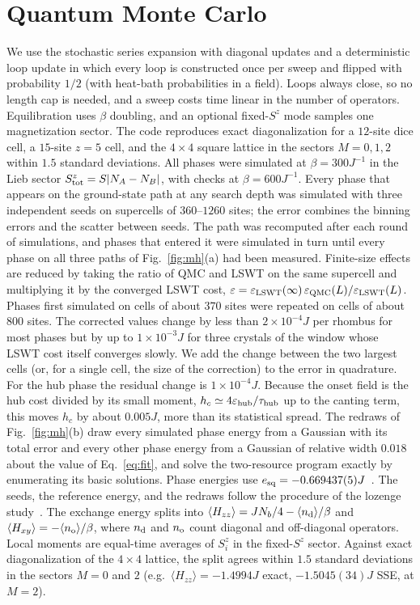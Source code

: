 \documentclass[aps,prb,twocolumn,superscriptaddress,floatfix]{revtex4-2}
\newcommand{\eps}{\varepsilon}
\begin{document}
\section{Quantum Monte Carlo}\label{app:qmc}
We use the stochastic series expansion with diagonal updates and a deterministic loop update in which every loop is constructed once per sweep and flipped with probability $1/2$ (with heat-bath probabilities in a field). Loops always close, so no length cap is needed, and a sweep costs time linear in the number of operators. Equilibration uses $\beta$ doubling, and an optional fixed-$S^z$ mode samples one magnetization sector. The code reproduces exact diagonalization for a $12$-site dice cell, a $15$-site $z=5$ cell, and the $4\times4$ square lattice in the sectors $M=0,1,2$ within $1.5$ standard deviations. All phases were simulated at $\beta=300J^{-1}$ in the Lieb sector $S^z_{\rm tot}=S|N_A-N_B|$, with checks at $\beta=600J^{-1}$. Every phase that appears on the ground-state path at any search depth was simulated with three independent seeds on supercells of $360$--$1260$ sites; the error combines the binning errors and the scatter between seeds. The path was recomputed after each round of simulations, and phases that entered it were simulated in turn until every phase on all three paths of Fig.~\ref{fig:mh}(a) had been measured. Finite-size effects are reduced by taking the ratio of QMC and LSWT on the same supercell and multiplying it by the converged LSWT cost, $\eps=\eps_{\rm LSWT}(\infty)\,\eps_{\rm QMC}(L)/\eps_{\rm LSWT}(L)$. Phases first simulated on cells of about $370$ sites were repeated on cells of about $800$ sites. The corrected values change by less than $2\times10^{-4}J$ per rhombus for most phases but by up to $1\times10^{-3}J$ for three crystals of the window whose LSWT cost itself converges slowly. We add the change between the two largest cells (or, for a single cell, the size of the correction) to the error in quadrature. For the hub phase the residual change is $1\times10^{-4}J$. Because the onset field is the hub cost divided by its small moment, $h_c\simeq4\eps_{\rm hub}/\tau_{\rm hub}$ up to the canting term, this moves $h_c$ by about $0.005J$, more than its statistical spread. The redraws of Fig.~\ref{fig:mh}(b) draw every simulated phase energy from a Gaussian with its total error and every other phase energy from a Gaussian of relative width $0.018$ about the value of Eq.~\eqref{eq:fit}, and solve the two-resource program exactly by enumerating its basic solutions. Phase energies use $e_{\rm sq}=-0.669437(5)J$~\cite{Sandvik1997}. The seeds, the reference energy, and the redraws follow the procedure of the lozenge study~\cite{Yoo2026}. The exchange energy splits into $\langle H_{zz}\rangle=JN_b/4-\langle n_{\rm d}\rangle/\beta$ and $\langle H_{xy}\rangle=-\langle n_{\rm o}\rangle/\beta$, where $n_{\rm d}$ and $n_{\rm o}$ count diagonal and off-diagonal operators. Local moments are equal-time averages of $S_i^z$ in the fixed-$S^z$ sector. Against exact diagonalization of the $4\times4$ lattice, the split agrees within $1.5$ standard deviations in the sectors $M=0$ and $2$ (e.g.\ $\langle H_{zz}\rangle=-1.4994J$ exact, $-1.5045(34)J$ SSE, at $M=2$).
\end{document}
